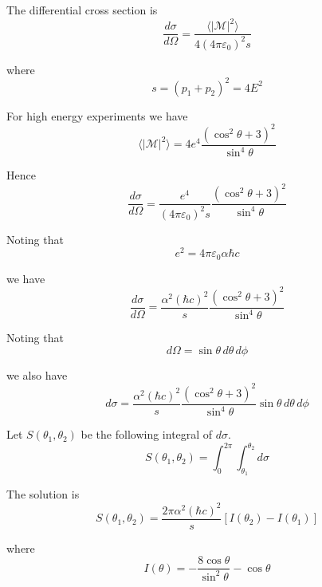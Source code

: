 The differential cross section is
\begin{equation*}
\frac{d\sigma}{d\Omega}=\frac{\langle|\mathcal{M}|^2\rangle}{4(4\pi\varepsilon_0)^2s}
\end{equation*}

where
\begin{equation*}
s=(p_1+p_2)^2=4E^2
\end{equation*}

For high energy experiments we have
\begin{equation*}
\langle|\mathcal{M}|^2\rangle=4e^4\frac{(\cos^2\theta+3)^2}{\sin^4\theta}
\end{equation*}

Hence
\begin{equation*}
\frac{d\sigma}{d\Omega}=\frac{e^4}{(4\pi\varepsilon_0)^2s}\frac{(\cos^2\theta+3)^2}{\sin^4\theta}
\end{equation*}

Noting that
\begin{equation*}
e^2=4\pi\varepsilon_0\alpha\hbar c
\end{equation*}

we have
\begin{equation*}
\frac{d\sigma}{d\Omega}=\frac{\alpha^2(\hbar c)^2}{s}
\frac{(\cos^2\theta+3)^2}{\sin^4\theta}
\end{equation*}

Noting that
\begin{equation*}
d\Omega=\sin\theta\,d\theta\,d\phi
\end{equation*}

we also have
\begin{equation*}
d\sigma=\frac{\alpha^2(\hbar c)^2}{s}
\frac{(\cos^2\theta+3)^2}{\sin^4\theta}
\sin\theta\,d\theta\,d\phi
\end{equation*}

Let $S(\theta_1,\theta_2)$ be the following integral of $d\sigma$.
\begin{equation*}
S(\theta_1,\theta_2)=\int_0^{2\pi}\int_{\theta_1}^{\theta_2}d\sigma
\end{equation*}

The solution is
\begin{equation*}
S(\theta_1,\theta_2)=\frac{2\pi\alpha^2(\hbar c)^2}{s}[I(\theta_2)-I(\theta_1)]
\end{equation*}

where
\begin{equation*}
I(\theta)=-\frac{8\cos\theta}{\sin^2\theta}-\cos\theta
\end{equation*}

